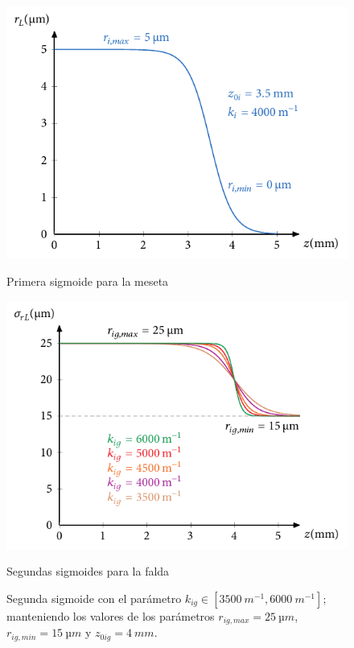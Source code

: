 \begin{figure}[htbp]
  \centering
  \begin{subcaptionblock}{.4\textwidth}
    \centering
    \includegraphics[width=\textwidth]{Figuras/ch4_ejsigm3.pdf}
    \caption{Primera sigmoide para la meseta}\label{fig:ch4_sigm1_rg}
  \end{subcaptionblock}
  \begin{subcaptionblock}{.4\textwidth}
    \centering
    \includegraphics[width=\textwidth]{Figuras/ch4_sigm_kg.pdf}
    \caption{Segundas sigmoides para la falda}\label{fig:ch4_sigm2_rg}
  \end{subcaptionblock}
  \caption{Segunda sigmoide con el parámetro $k_{ig}\in[\qty{3500}{m^{-1}},\qty{6000}{m^{-1}}]$; manteniendo los valores de los parámetros $r_{ig,max}=\qty{25}{µm}$, $r_{ig,min}=\qty{15}{µm}$ y $z_{0ig}=\qty{4}{mm}$.}
   \label{fig:4.27}
\end{figure}

